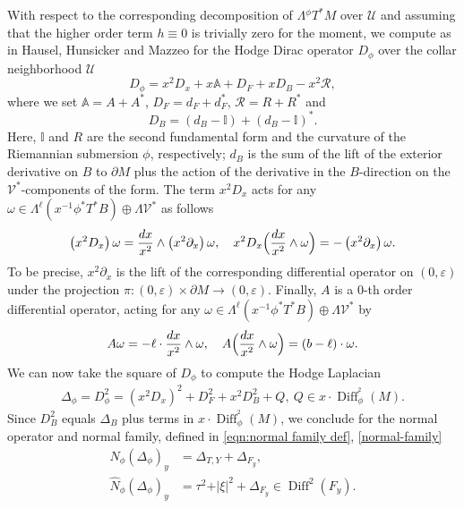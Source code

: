 \documentclass[JEP,XML,SOM,Unicode,NoFloatCountersInSection,published]{cedram}
\theoremstyle{plain}
\theoremstyle{definition}
\newcommand\calV{{\mathcal V}}
\DeclareMathOperator{\Diff}{Diff}
\begin{document}
With respect to the corresponding decomposition of $\Lambda {}^\phi T^*M$ over $\mathscr{U}$
and assuming that the higher order term $h\equiv 0$ is trivially zero for the moment, we compute as in Hausel, Hunsicker and Mazzeo \cite[\S 5.3.2]{gravi-ins} for the Hodge Dirac operator $D_\phi$ over the collar neighborhood $\mathscr{U}$
\begin{equation}\label{hodge de rham}
D_\phi = x^{2}D_{x} + x \mathbb{A} + D_{F} + xD_{B}
-x^{2}\mathscr{R},
\end{equation}
where we set $\mathbb{A} = A + A^{*}$, $D_{F} = d_{F} + d_{F}^{*}$, $\mathscr{R} = R + R^{*}$ and
\begin{equation}\label{DB}
D_{B} = \left(d_{B} - \mathbb{I} \right) + \left(d_{B} - \mathbb{I} \right)^*.
\end{equation}
Here, $\mathbb{I}$ and $R$ are the second fundamental form and the curvature of
the Riemannian submersion $\phi$, respectively; $d_B$ is the sum of the lift of the exterior derivative on $B$ to $\partial M$
plus the action of the derivative in the $B$-direction on
the $\calV^*$-components of the form. The term $x^{2}D_{x}$
acts for any $\omega \in \Lambda^\ell \left(x^{-1} \phi^*T^*B\right) \oplus \Lambda \calV^*$ as follows
\[
\left(x^{2}D_{x}\right) \omega = \frac{dx}{x^2} \wedge \left(x^{2}\partial_{x} \right) \omega, \quad
x^{2}D_{x} \Bigl(\frac{dx}{x^2} \wedge \omega \Bigr) = -\left(x^{2}\partial_{x} \right) \omega.
\]
To be precise, $x^2\partial_x$ is the lift of the corresponding differential operator
on $(0,\varepsilon)$ under the projection $\pi: (0,\varepsilon) \times
\partial M \to (0,\varepsilon)$. Finally, $A$ is a $0$-th order differential operator, acting for any
$\omega \in \Lambda^\ell \left(x^{-1} \phi^*T^*B\right) \oplus \Lambda \calV^*$ by
\[
A \omega = -\ell \cdot \frac{dx}{x^2} \wedge \omega, \quad
A \Bigl(\frac{dx}{x^2} \wedge \omega \Bigr) = (b-\ell) \cdot \omega.
\]
We can now take the square of $D_\phi$ to compute the Hodge Laplacian
\begin{equation}\label{hodge laplace}\begin{split}
\Delta_{\phi} = D^2_\phi = (x^{2}D_{x})^2 + D^2_{F} + x^2D^2_{B}
+Q, \ Q \in x\cdot \Diff^{^2}_{\phi}(M).
\end{split}\end{equation}
Since $D^2_B$ equals $\Delta_B$ plus terms in $x\cdot \Diff^{^2}_{\phi}(M)$, we conclude
for the normal operator and normal family, defined in \eqref{eqn:normal family def}, \eqref{normal-family}
\begin{align}
\label{eqn:normal op Delta}
N_\phi(\Delta_{\phi})_{y} &= \Delta_{T,Y} + \Delta_{F_y},
\\
\label{NP}
\widehat{N}_{\phi}(\Delta_{\phi})_{y} &= \tau^2 + \vert \xi \vert^{2}
+ \Delta_{F_y} \in \Diff^{2}(F_y).
\end{align}
\end{document}
